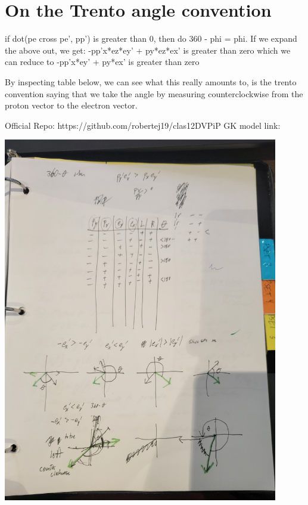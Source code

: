 \chapter{On the Trento angle convention}

if dot(pe cross pe', pp') is greater than 0, then do 360 - phi = phi.
If we expand the above out, we get:
-pp'x*ez*ey' + py*ez*ex' is greater than zero
which we can reduce to 
-pp'x*ey' + py*ex' is greater than zero

By inspecting table below, we can see what this really amounts to, is the trento convention saying that we take the angle by measuring counterclockwise from the proton vector to the electron vector.


Official Repo: https://github.com/robertej19/clas12DVPiP
GK model link: 

\includegraphics[width=0.9\textwidth]{basics/phi_math_1.jpg}